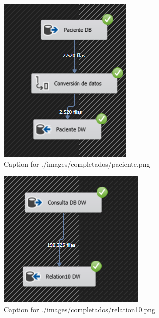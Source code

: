 \documentclass{article}
\begin{document}
\begin{figure}[H]
  \centering
  \includegraphics[width=\linewidth]{./images/completados/paciente.png}
  \caption{Caption for ./images/completados/paciente.png}
\end{figure}
\begin{figure}[H]
  \centering
  \includegraphics[width=\linewidth]{./images/completados/relation10.png}
  \caption{Caption for ./images/completados/relation10.png}
\end{figure}
\end{document}
